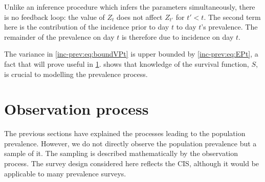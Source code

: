 \documentclass[thesis.tex]{subfiles}
\begin{document}

Unlike an inference procedure which infers the parameters simultaneously, there is no feedback loop: the value of $Z_{t}$ does not affect $Z_{t'}$ for $t' < t$.
The second term here is the contribution of the incidence prior to day $t$ to day $t$'s prevalence.
The remainder of the prevalence on day $t$ is therefore due to incidence on day $t$.

The variance in \cref{inc-prev:eq:boundVPt} is upper bounded by \cref{inc-prev:eq:EPt}, a fact that will prove useful in \cref{inc-prev:sec:observation-process}.
 shows that knowledge of the survival function, $S$, is crucial to modelling the prevalence process.

\section{Observation process} \label{inc-prev:sec:observation-process}

The previous sections have explained the processes leading to the population prevalence.
However, we do not directly observe the population prevalence but a sample of it.
The sampling is described mathematically by the observation process.
The survey design considered here reflects the CIS, although it would be applicable to many prevalence surveys.
\end{document}
